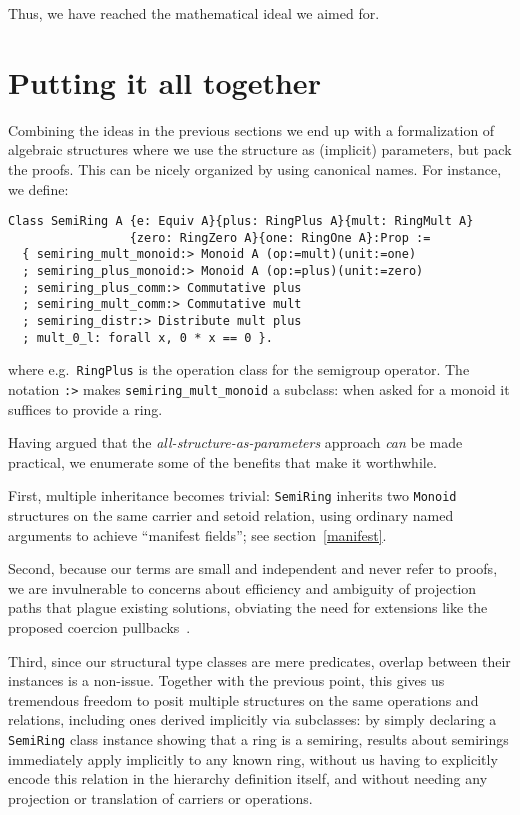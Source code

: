 \documentclass[a4paper,10pt,runningheads]{llncs}
\begin{document}
Thus, we have reached the mathematical ideal we aimed for.

\section{Putting it all together}\label{classes}
Combining the ideas in the previous sections we end up with a formalization of algebraic
structures where we use the structure as (implicit) parameters, but
pack the proofs. This can be nicely organized by using canonical names. For instance, we define:
\begin{lstlisting}
Class SemiRing A {e: Equiv A}{plus: RingPlus A}{mult: RingMult A}
                 {zero: RingZero A}{one: RingOne A}:Prop :=
  { semiring_mult_monoid:> Monoid A (op:=mult)(unit:=one)
  ; semiring_plus_monoid:> Monoid A (op:=plus)(unit:=zero)
  ; semiring_plus_comm:> Commutative plus
  ; semiring_mult_comm:> Commutative mult
  ; semiring_distr:> Distribute mult plus
  ; mult_0_l: forall x, 0 * x == 0 }.
\end{lstlisting}

where e.g.\ \lstinline|RingPlus| is the operation class for the semigroup operator.
The notation \lstinline|:>| makes \lstinline|semiring_mult_monoid| a subclass: when asked for a monoid it suffices to
provide a ring.

Having argued that the \emph{all-structure-as-parameters} approach \emph{can} be made practical, we enumerate some of the benefits that make it worthwhile.

First, multiple inheritance becomes trivial: \lstinline|SemiRing| inherits two \lstinline|Monoid| structures on the same carrier and setoid relation, using ordinary named arguments to achieve ``manifest fields''; see section~\ref{manifest}.

Second, because our terms are small and independent and never refer to proofs, we are invulnerable to concerns about efficiency and ambiguity of projection paths that plague existing solutions, obviating the need for extensions like the proposed coercion pullbacks~\cite{Hints}.

Third, since our structural type classes are mere predicates, overlap between their instances is a non-issue. Together with the previous point, this gives us tremendous freedom to posit multiple structures on the same operations and relations, including ones derived implicitly via subclasses: by simply declaring a \lstinline|SemiRing| class instance showing that a ring is a semiring, results about semirings immediately apply implicitly to any known ring, without us having to explicitly encode this relation in the hierarchy definition itself, and without needing any projection or translation of carriers or operations.
\end{document}
